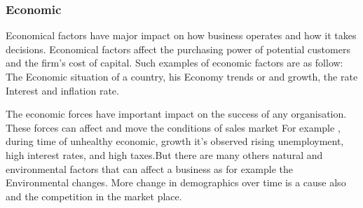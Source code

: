 \subsubsection{Economic}
Economical factors have major impact on how business operates and how it takes decisions. Economical factors affect the purchasing power of potential customers and the firm's cost of capital. Such examples of economic factors are as follow: The Economic situation of a country, his Economy trends or and growth, the rate Interest and inflation rate.
\par
The economic forces have important impact on the success of any organisation. These forces can affect and move the conditions of sales market For example , during time of unhealthy economic,  growth it’s observed rising unemployment, high interest rates, and high taxes.But there are many others natural and environmental factors that can affect a business as for example the Environmental changes. More change in demographics over time is a cause also and the competition in the market place.

